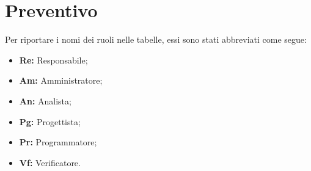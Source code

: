\section{Preventivo}

Per riportare i nomi dei ruoli nelle tabelle, essi sono stati abbreviati come segue:
\begin{itemize}
  \item \textbf{Re:} Responsabile;
  \item \textbf{Am:} Amministratore;
  \item \textbf{An:} Analista;
  \item \textbf{Pg:} Progettista;
  \item \textbf{Pr:} Programmatore;
  \item \textbf{Vf:} Verificatore.
\end{itemize}






